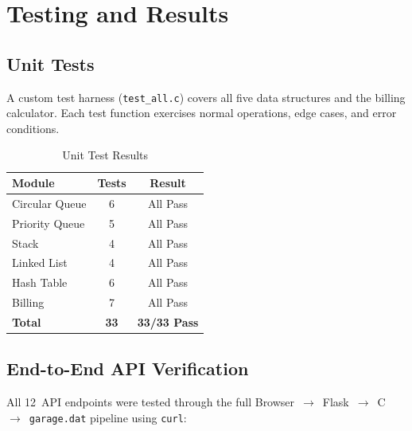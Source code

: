 \documentclass[12pt, a4paper]{report}
\begin{document}
\chapter{Testing and Results}

\section{Unit Tests}

A custom test harness (\texttt{test\_all.c}) covers all five data
structures and the billing calculator.  Each test function exercises
normal operations, edge cases, and error conditions.

\begin{table}[H]
\centering
\caption{Unit Test Results}
\label{tab:tests}
\begin{tabular}{lcc}
\toprule
\textbf{Module} & \textbf{Tests} & \textbf{Result} \\
\midrule
Circular Queue    & 6 & \textcolor{green!50!black}{All Pass} \\
Priority Queue    & 5 & \textcolor{green!50!black}{All Pass} \\
Stack             & 4 & \textcolor{green!50!black}{All Pass} \\
Linked List       & 4 & \textcolor{green!50!black}{All Pass} \\
Hash Table        & 6 & \textcolor{green!50!black}{All Pass} \\
Billing           & 7 & \textcolor{green!50!black}{All Pass} \\
\midrule
\textbf{Total}    & \textbf{33} & \textbf{\textcolor{green!50!black}{33/33 Pass}} \\
\bottomrule
\end{tabular}
\end{table}

\section{End-to-End API Verification}

All 12~API endpoints were tested through the full
Browser~$\to$~Flask~$\to$~C~$\to$~\texttt{garage.dat} pipeline using
\texttt{curl}:
\end{document}
